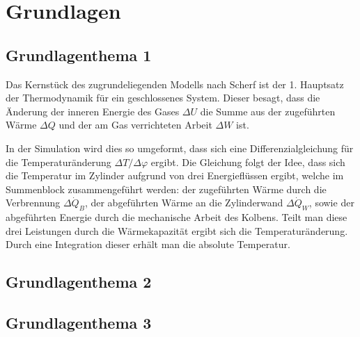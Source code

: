 \section{Grundlagen}

\subsection{Grundlagenthema 1}
Das Kernstück des zugrundeliegenden Modells nach Scherf ist der 1. Hauptsatz der Thermodynamik für ein geschlossenes System. 
Dieser besagt, dass die Änderung der inneren Energie des Gases $\Delta U$ die Summe aus der zugeführten Wärme $\Delta Q$ und der am Gas verrichteten Arbeit $\Delta W$ ist.

In der Simulation wird dies so umgeformt, dass sich eine Differenzialgleichung für die Temperaturänderung $\Delta T / \Delta \varphi$  ergibt. 
Die Gleichung folgt der Idee, dass sich die Temperatur im Zylinder aufgrund von drei Energieflüssen ergibt, welche im Summenblock zusammengeführt werden: der zugeführten Wärme durch die Verbrennung $\Delta \dot{Q}_B$, der abgeführten Wärme an die Zylinderwand $\Delta \dot{Q}_W$, sowie der abgeführten Energie durch die mechanische Arbeit des Kolbens. 
Teilt man diese drei Leistungen durch die Wärmekapazität ergibt sich die Temperaturänderung. 
Durch eine Integration dieser erhält man die absolute Temperatur.

\subsection{Grundlagenthema 2}


\subsection{Grundlagenthema 3}
